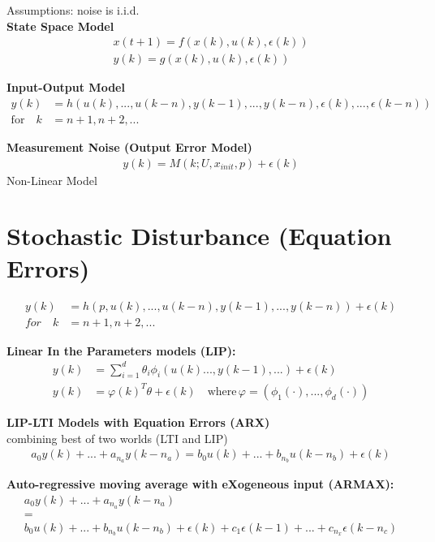 \begin{tcolorbox}[colback=green!5!white,colframe=green!75!black,title=\textbf{Stochastic Model}]
	
	Assumptions:  noise is i.i.d.\\
	
	\textbf{State Space Model}
	\begin{align*}
	x(t+1) = f(x(k), u(k), \epsilon(k)) \\
	y(k) = g(x(k), u(k), \epsilon(k))
	\end{align*}
	
	\textbf{Input-Output Model}
	\begin{align*}
	y(k) &= h(u(k), ..., u(k-n), y(k-1), ..., y(k-n), \epsilon(k), ..., \epsilon(k-n))\\
	\text{for} \quad k &= n + 1, n + 2, ...
	\end{align*}
	
	
	\textbf{Measurement Noise (Output Error Model)}
	\begin{align*}
	y(k) = M(k; U, x_{init}, p) + \epsilon(k)
	\end{align*}
	Non-Linear Model
	\tcblower
	\section*{Stochastic Disturbance (Equation Errors)}
	\begin{align*}
	y(k) &= h(p, u(k), ..., u(k-n), y(k-1), ..., y(k-n)) + \epsilon(k)\\
	for \quad k& = n + 1, n + 2, ...
	\end{align*}
	
	\textbf{Linear In the Parameters models (LIP):}
	\begin{align*}
	y(k) &= \sum_{ i = 1}^{d}\theta_i\phi_i(u(k)...,y(k-1),...)+\epsilon(k)\\
	y(k) &= \varphi(k)^T\theta + \epsilon(k) \quad \text{where} \, \varphi = (\phi_1(\cdot),... ,\phi_d(\cdot)) 
	\end{align*}

	\textbf{LIP-LTI Models with Equation Errors (ARX)}\\
	combining best of two worlds (LTI and LIP)
	\begin{align*}
	a_0y(k) + ...+a_{n_{a}}y(k-n_a) = b_0u(k) + ... + b_{n_{b}}u(k-n_b) + \epsilon(k)
	\end{align*}
	
	\textbf{Auto-regressive moving average with eXogeneous input (ARMAX):}
	\begin{align*}
	a_0y(k) + ... + a_{n_a}y(k-n_a)\\
	=\\
	b_0u(k) + ... + b_{n_b} u(k - n_b) + \epsilon(k) + c_1 \epsilon(k-1) + ... + c_{n_x} \epsilon(k-n_c)
	\end{align*}
	

\end{tcolorbox}
